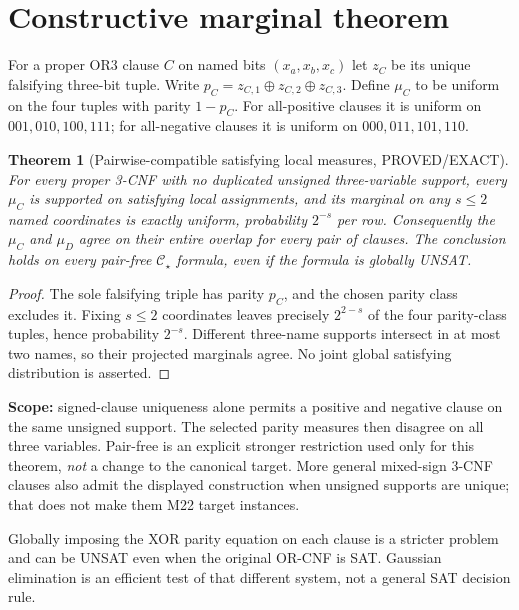 \documentclass[11pt]{article}
\newtheorem{theorem}{Theorem}
\begin{document}
\section{Constructive marginal theorem}
For a proper OR3 clause $C$ on named bits $(x_a,x_b,x_c)$ let $z_C$ be its unique falsifying three-bit tuple. Write $p_C=z_{C,1}\oplus z_{C,2}\oplus z_{C,3}$. Define $\mu_C$ to be uniform on the four tuples with parity $1-p_C$. For all-positive clauses it is uniform on $001,010,100,111$; for all-negative clauses it is uniform on $000,011,101,110$.
\begin{theorem}[Pairwise-compatible satisfying local measures, PROVED/EXACT]
For every proper 3-CNF with no duplicated \emph{unsigned} three-variable support, every $\mu_C$ is supported on satisfying local assignments, and its marginal on any $s\le2$ named coordinates is exactly uniform, probability $2^{-s}$ per row. Consequently the $\mu_C$ and $\mu_D$ agree on their entire overlap for every pair of clauses. The conclusion holds on every pair-free $\mathcal C_\star$ formula, even if the formula is globally UNSAT.
\end{theorem}
\begin{proof}
The sole falsifying triple has parity $p_C$, and the chosen parity class excludes it. Fixing $s\le2$ coordinates leaves precisely $2^{2-s}$ of the four parity-class tuples, hence probability $2^{-s}$. Different three-name supports intersect in at most two names, so their projected marginals agree. No joint global satisfying distribution is asserted.
\end{proof}
\par\noindent \textbf{Scope:} signed-clause uniqueness alone permits a positive and negative clause on the same unsigned support. The selected parity measures then disagree on all three variables. Pair-free is an explicit stronger restriction used only for this theorem, \emph{not} a change to the canonical target. More general mixed-sign 3-CNF clauses also admit the displayed construction when unsigned supports are unique; that does not make them M22 target instances.
\par\noindent Globally imposing the XOR parity equation on each clause is a stricter problem and can be UNSAT even when the original OR-CNF is SAT. Gaussian elimination is an efficient test of that different system, not a general SAT decision rule.
\end{document}
